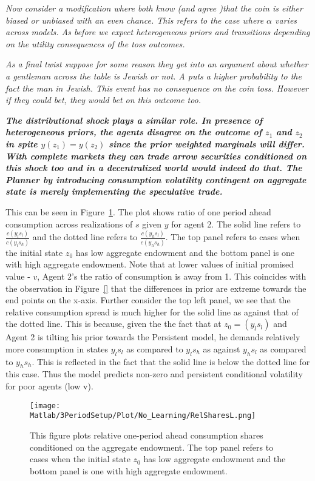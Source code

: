\documentclass[12pt]{article}
\begin{document}
\noindent \emph{Now consider a modification where both know (and agree )that the coin is either biased or unbiased with an even chance. This refers to the case where $\alpha$ varies across models. As before we expect heterogeneous priors and transitions depending on the utility consequences of the toss outcomes. }

\noindent \emph{ As a final twist  suppose for some reason they get into an argument about whether a gentleman across the table is Jewish or not. A puts a higher probability to the fact the man in Jewish. This event has no consequence on the coin toss. However if they could bet, they would bet on this outcome too.}

\noindent \emph{\textbf{The distributional shock plays a similar role. In presence of heterogeneous priors, the agents disagree on the outcome of $z_1$ and $z_2$ in spite  $y(z_1)=y(z_2)$ since the prior weighted marginals will differ. With complete markets they can trade arrow securities conditioned on this shock too and in a decentralized world would indeed do that. The Planner by introducing consumption volatility contingent on aggregate state is merely implementing the speculative trade. }
}


\noindent This can be seen in Figure~\ref{fig:RelSharesL}. The plot shows ratio of one period ahead consumption across realizations of $s$ given $y$ for agent 2. The solid  line refers to $\frac{c(y_ls_l)}{c(y_ls_h)}$ and the dotted line refers to $\frac{c(y_hs_l)}{c(y_hs_h)}$. The top panel refers to cases when the initial state $z_0$ has low aggregate endowment and the bottom panel is one with high aggregate endowment. Note that at lower values of initial promised value - $v$, Agent 2's the ratio of consumption is away from 1.  This coincides with the observation in Figure~\ref{} that the differences in prior are extreme towards the end points on the x-axis.  Further consider the top left panel,  we see that the relative consumption spread is much higher for the solid line as against that of the dotted line. This is because, given the the fact that at $z_0=(y_{l}s_{l})$ and Agent 2  is tilting his prior towards the Persistent model, he  demands relatively more consumption in states $y_{l}s_{l}$ as compared to $y_{l}s_{h}$ as against $y_{h}s_{l}$ as compared to $y_{h}s_{h}$. This is reflected in the fact that the solid line is below the dotted line for this case. Thus the model predicts non-zero and persistent conditional volatility for poor agents (low v). 
\begin{figure}[htbp]
\centering
	  \texttt{[image: Matlab/3PeriodSetup/Plot/No\_Learning/RelSharesL.png]}

	\caption{This figure plots relative one-period ahead consumption shares conditioned on the aggregate endowment. The top panel refers to cases when the initial state $z_0$ has low aggregate endowment and the bottom panel is one with high aggregate endowment.}
	\label{fig:RelSharesL}
\end{figure} 
\end{document}
